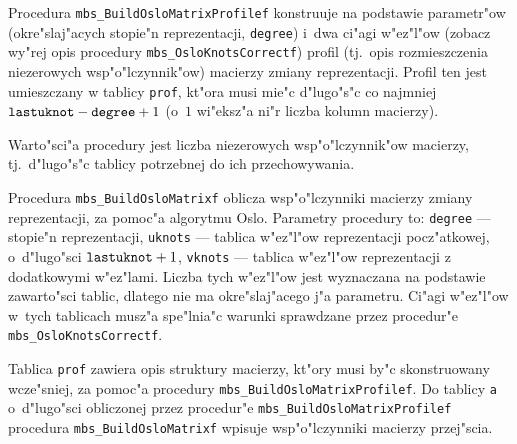 \vspace{\bigskipamount}
Procedura \texttt{mbs\_BuildOsloMatrixProfilef} konstruuje na podstawie
parametr"ow (okre"slaj"acych stopie"n reprezentacji, \texttt{degree}) i~dwa
ci"agi w"ez"l"ow (zobacz wy"rej opis procedury
\texttt{mbs\_OsloKnotsCorrectf}) profil (tj.\ opis rozmieszczenia
niezerowych wsp"o"lczynnik"ow) macierzy zmiany reprezentacji. Profil ten
jest umieszczany w tablicy \texttt{prof}, kt"ora musi mie"c d"lugo"s"c co
najmniej
$\mathord{\mbox{\texttt{lastuknot}}}-\mathord{\mbox{\texttt{degree}}}+1$
(o~$1$ wi"eksz"a ni"r liczba kolumn macierzy).

Warto"sci"a procedury jest liczba niezerowych wsp"o"lczynnik"ow macierzy,
tj.\ d"lugo"s"c tablicy potrzebnej do ich przechowywania.

\vspace{\bigskipamount}
Procedura \texttt{mbs\_BuildOsloMatrixf} oblicza wsp"o"lczynniki macierzy
zmiany reprezentacji, za pomoc"a algorytmu Oslo. Parametry procedury to:
\texttt{degree} --- stopie"n reprezentacji, \texttt{uknots} --- tablica
w"ez"l"ow reprezentacji pocz"atkowej, o~d"lugo"sci
$\mathord{\mbox{\texttt{lastuknot}}}+1$, \texttt{vknots} --- tablica
w"ez"l"ow reprezentacji z dodatkowymi w"ez"lami. Liczba tych w"ez"l"ow
jest wyznaczana na podstawie zawarto"sci tablic, dlatego nie ma
okre"slaj"acego j"a parametru. Ci"agi w"ez"l"ow w~tych tablicach
musz"a spe"lnia"c warunki sprawdzane przez procedur"e
\texttt{mbs\_OsloKnotsCorrectf}.

Tablica \texttt{prof} zawiera opis struktury macierzy, kt"ory musi by"c
skonstruowany wcze"sniej, za pomoc"a procedury
\texttt{mbs\_BuildOsloMatrixProfilef}. Do tablicy \texttt{a} o~d"lugo"sci
obliczonej przez procedur"e
\texttt{mbs\_BuildOsloMatrixProfilef} procedura
\texttt{mbs\_BuildOsloMatrixf} wpisuje wsp"o"lczynniki macierzy przej"scia.

